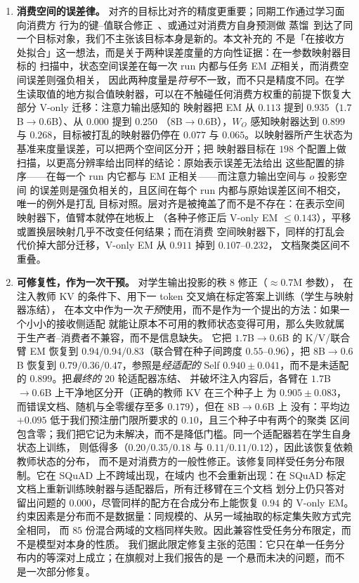\documentclass[11pt]{article}
\begin{document}
\begin{enumerate}
\item \textbf{消费空间的误差律。} 对齐的目标比对齐的精度更重要；同期工作通过学习面向消费方
  行为的键--值联合修正~\cite{cachelink2026}、或通过对消费方自身预测做
  蒸馏~\cite{kvlingo2026}到达了同一个目标对象，我们不主张该目标本身是新的。本文补充的
  不是「在接收方处拟合」这一想法，而是关于两种误差度量的方向性证据：在一参数映射器目标的
  扫描中，状态空间误差在每一次 run 内都与任务 EM \emph{正}相关，而消费空间误差则强负相关，
  因此两种度量是\emph{符号}不一致，而不只是精度不同。在学生读取值的地方拟合值映射器，可以在不触碰任何消费方权重的前提下恢复大部分
  V-only 迁移：注意力输出感知的
  映射器把 EM 从 $0.113$ 提到 $0.935$（$1.7$B$\to0.6$B）、从 $0.000$ 提到 $0.250$
  （$8$B$\to0.6$B），$W_O$ 感知映射器达到 $0.899$ 与 $0.268$，目标被打乱的映射器仍停在
  $0.077$ 与 $0.065$。以映射器所产生状态为基准来度量误差，可以把两个空间区分开；把
  映射器目标在 $198$ 个配置上做扫描，以更高分辨率给出同样的结论：原始表示误差无法给出
  这些配置的排序——在每一个 run 内它都与 EM 正相关——而注意力输出空间与 $o$ 投影空间
  的误差则是强负相关的，且区间在每个 run 内都与原始误差区间不相交，唯一的例外是打乱
  目标对照。层对齐是被掩盖了而不是不存在：在表示空间映射器下，值臂本就停在地板上
  （各种子修正后 V-only EM $\le0.143$），平移或置换层映射几乎不改变任何结果；而在消费
  空间映射器下，同样的打乱会代价掉大部分迁移，V-only EM 从 $0.911$ 掉到 $0.107$--$0.232$，
  文档聚类区间不重叠。

\item \textbf{可修复性，作为一次干预。} 对学生输出投影的秩 8 修正（$\approx0.7$M 参数），
  在注入教师 KV 的条件下、用下一 token 交叉熵在标定答案上训练（学生与映射器冻结），
  在本文中作为一次\emph{干预}使用，而不是作为一个提出的方法：如果一个小小的接收侧适配
  就能让原本不可用的教师状态变得可用，那么失败就属于生产者--消费者不兼容，而不是信息缺失。
  它把 $1.7$B$\to0.6$B 的 K/V/联合臂 EM 恢复到 $0.94/0.94/0.83$（联合臂在种子间跨度
  $0.55$--$0.96$），把 $8$B$\to0.6$B 恢复到 $0.79/0.36/0.47$，参照是\emph{经适配的}
  Self $0.940\pm0.041$，而不是未适配的 $0.899$。把\emph{最终的} $20$ 轮适配器冻结、
  并破坏注入内容后，各臂在 $1.7$B$\to0.6$B 上干净地区分开（正确的教师 KV 在三个种子上
  为 $0.905\pm0.083$，而错误文档、随机与全零缓存至多 $0.179$），但在 $8$B$\to0.6$B 上
  没有：平均边 $+0.095$ 低于我们预注册门限所要求的 $0.10$，且三个种子中有两个的聚类
  区间包含零；我们把它记为未解决，而不是降低门槛。同一个适配器若在学生自身状态上训练，
  则低得多（$0.20/0.35/0.18$ 与 $0.11/0.11/0.12$），因此该恢复依赖教师状态的分布，
  而不是对消费方的一般性修正。该修复同样受任务分布限制。它在 SQuAD 上不跨域出现，在域内
  也不会重新出现：在 SQuAD 标定文档上重新训练映射器与适配器后，所有迁移臂在三个文档
  划分上仍只答对留出问题的 $0.000$，尽管同样的配方在合成分布上能恢复 $0.94$ 的 V-only
  EM。约束因素是分布而不是数据量：同规模的、从另一域抽取的标定集失败方式完全相同，
  而 $85$ 份混合两域的文档同样失败。因此兼容性受任务分布限定，而不是模型对本身的性质。
  我们据此限定修复主张的范围：它只在单一任务分布内的等深对上成立；在旗舰对上我们报告的是
  一个悬而未决的问题，而不是一次部分修复。

\end{enumerate}
\end{document}
